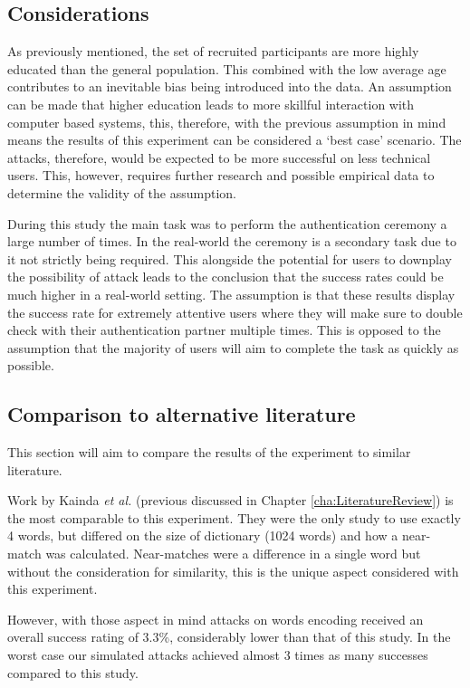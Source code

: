 \subsection*{Considerations}
As previously mentioned, the set of recruited participants are more highly educated than the general population. This combined with the low average age contributes to an inevitable bias being introduced into the data. An assumption can be made that higher education leads to more skillful interaction with computer based systems, this, therefore, with the previous assumption in mind means the results of this experiment can be considered a `best case' scenario. The attacks, therefore, would be expected to be more successful on less technical users. This, however, requires further research and possible empirical data to determine the validity of the assumption. 

During this study the main task was to perform the authentication ceremony a large number of times. In the real-world the ceremony is a secondary task due to it not strictly being required. This alongside the potential for users to downplay the possibility of attack leads to the conclusion that the success rates could be much higher in a real-world setting. The assumption is that these results display the success rate for extremely attentive users where they will make sure to double check with their authentication partner multiple times. This is opposed to the assumption that the majority of users will aim to complete the task as quickly as possible. 

\subsection*{Comparison to alternative literature}
This section will aim to compare the results of the experiment to similar literature.

Work by Kainda \textit{et al.}\cite{kainda2009usability} (previous discussed in Chapter \ref{cha:LiteratureReview}) is the most comparable to this experiment. They were the only study to use exactly 4 words, but differed on the size of dictionary (1024 words) and how a near-match was calculated. Near-matches were a difference in a single word but without the consideration for similarity, this is the unique aspect considered with this experiment.

However, with those aspect in mind attacks on words encoding received an overall success rating of 3.3\%, considerably lower than that of this study. In the worst case our simulated attacks achieved almost 3 times as many successes compared to this study.

